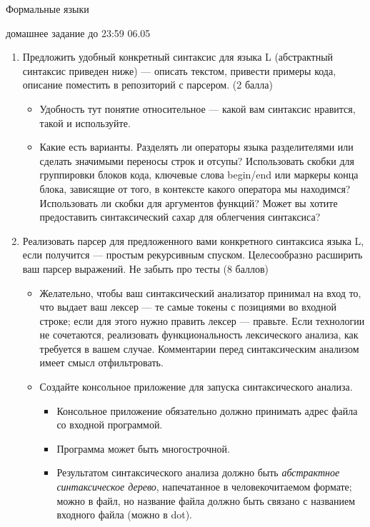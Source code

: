 \documentclass{article}
\begin{document}
\begin{center} {\LARGE Формальные языки} \end{center}

\begin{center} {\Large домашнее задание до 23:59 06.05} \end{center}
\bigskip

\begin{enumerate}
  \item Предложить удобный конкретный синтаксис для языка L (абстрактный синтаксис приведен ниже) --- описать текстом, привести примеры кода, описание поместить в репозиторий с парсером. (2 балла)
  \begin{itemize}
    \item Удобность тут понятие относительное --- какой вам синтаксис нравится, такой и используйте.
    \item Какие есть варианты. Разделять ли операторы языка разделителями или сделать значимыми переносы строк и отсупы? Использовать скобки для группировки блоков кода, ключевые слова begin/end или маркеры конца блока, зависящие от того, в контексте какого оператора мы находимся? Использовать ли скобки для аргументов функций? Может вы хотите предоставить синтаксический сахар для облегчения синтаксиса? 
  \end{itemize}
  \item Реализовать парсер для предложенного вами конкретного синтаксиса языка L, если получится --- простым рекурсивным спуском. Целесообразно расширить ваш парсер выражений. Не забыть про тесты (8 баллов)
    \begin{itemize}
        \item Желательно, чтобы ваш синтаксический анализатор принимал на вход то, что выдает ваш лексер --- те самые токены с позициями во входной строке; если для этого нужно править лексер --- правьте. Если технологии не сочетаются, реализовать функциональность лексического анализа, как требуется в вашем случае. Комментарии перед синтаксическим анализом имеет смысл отфильтровать.
        \item Создайте консольное приложение для запуска синтаксического анализа.
        \begin{itemize}
            \item Консольное приложение обязательно должно принимать адрес файла со входной программой.
            \item Программа может быть многострочной.
            \item Результатом синтаксического анализа должно быть \emph{абстрактное синтаксическое дерево}, напечатанное в человекочитаемом формате; можно в файл, но название файла должно быть связано с названием входного файла (можно в dot).

\end{itemize}
\end{itemize}
\end{enumerate}
\end{document}
